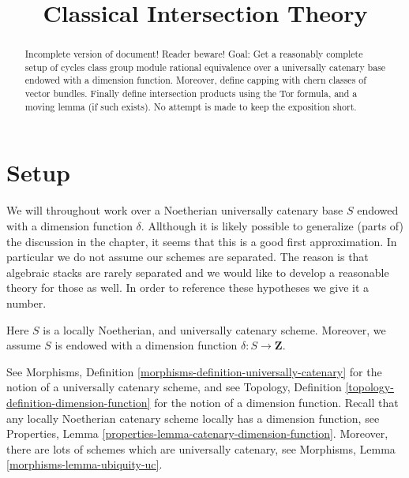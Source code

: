 

%


\title{Classical Intersection Theory}

\begin{abstract}
Incomplete version of document! Reader beware!
Goal: Get a reasonably complete setup of
cycles class group module rational equivalence
over a universally catenary base endowed with a dimension
function. Moreover, define capping with chern classes of
vector bundles. Finally define intersection products using
the Tor formula, and a moving lemma (if such exists).
No attempt is made to keep the exposition short.
\end{abstract}

\maketitle

\label{section-phantom}


\tableofcontents

\section{Setup}
\label{section-setup}

\noindent
We will throughout work over a Noetherian universally
catenary base $S$ endowed with a dimension function $\delta$.
Allthough it is likely possible to generalize (parts of) the
discussion in the chapter, it seems that this is a good first
approximation. In particular we do not assume our schemes are
separated. The reason is that algebraic stacks are rarely separated
and we would like to develop a reasonable theory for those as well.
In order to reference these hypotheses we give it a number.

\begin{situation}
\label{situation-setup}
Here $S$ is a locally Noetherian, and universally catenary scheme.
Moreover, we assume $S$ is endowed with a dimension function
$\delta : S \longrightarrow \mathbf{Z}$.
\end{situation}

\noindent
See Morphisms, Definition \ref{morphisms-definition-universally-catenary}
for the notion of a universally catenary scheme, and see
Topology, Definition \ref{topology-definition-dimension-function}
for the notion of a dimension function. Recall that any locally
Noetherian catenary scheme locally has a dimension function, see
Properties, Lemma \ref{properties-lemma-catenary-dimension-function}.
Moreover, there are lots of schemes which are universally catenary,
see Morphisms, Lemma \ref{morphisms-lemma-ubiquity-uc}.

